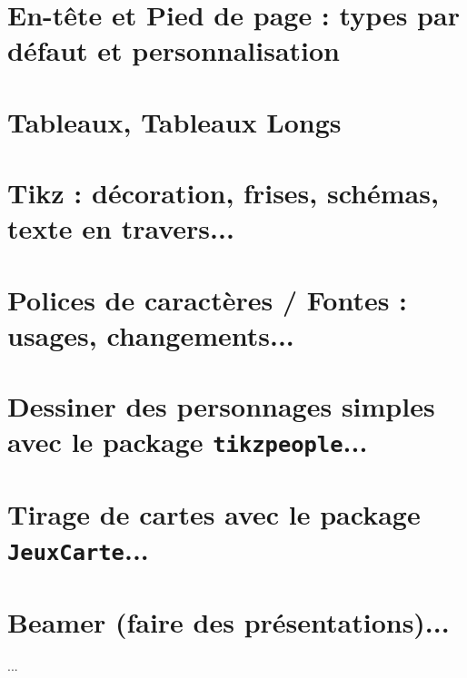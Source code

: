 \documentclass[11pt,twoside,a4paper]{article}
\begin{document}
\begin{landscape}
\begin{multicols}{2}
	\section{En-tête et Pied de page : types par défaut et personnalisation} 
	\section{Tableaux, Tableaux Longs} 
	\section{Tikz : décoration, frises, schémas, texte en travers...}  
	\section{Polices de caractères / Fontes : usages, changements...} 
	\section{Dessiner des personnages simples avec le package \texttt{tikzpeople}...}
	\section{Tirage de cartes avec le package \texttt{JeuxCarte}...}
	\section{Beamer (faire des présentations)...}
	
	...
\end{multicols}

\clearpage

\end{landscape}
\end{document}
